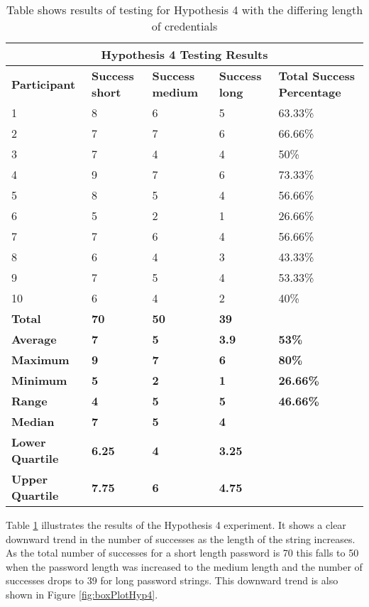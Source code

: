 \documentclass{article}
\begin{document}
{
\begin{table} [H]
\centering
\begin{tabular}{ |p{2cm}|p{2cm}|p{2cm}| p{2cm}| p{2cm}| }
\hline
\multicolumn{5}{|c|}{\textbf{Hypothesis 4 Testing Results}} \\
\hline
\textbf{Participant} & \textbf{Success short} & \textbf{Success medium} & \textbf{Success long}  & \textbf{Total Success Percentage} \\
\hline
1 & 8 & 6 & 5 & 63.33\% \\
\hline
2 & 7 & 7 & 6 & 66.66\% \\
\hline
3 & 7 & 4 & 4 & 50\% \\
\hline
4 & 9 & 7 & 6 & 73.33\%  \\
\hline
5 & 8 & 5 & 4 & 56.66\% \\
\hline
6 & 5 & 2 & 1 & 26.66\% \\
\hline
7 & 7 & 6 & 4 & 56.66\% \\
\hline
8 & 6 & 4 & 3 & 43.33\% \\
\hline
9 & 7 & 5 & 4 & 53.33\% \\
\hline
10 & 6 & 4 & 2 & 40\% \\
\hline
\textbf{Total} & \textbf{70} & \textbf{50} & \textbf{39} & \\
\hline
\textbf{Average} & \textbf{7} & \textbf{5} & \textbf{3.9} & \textbf{53\%} \\
\hline
\textbf{Maximum} & \textbf{9} & \textbf{7} & \textbf{6} & \textbf{80\%} \\
\hline
\textbf{Minimum} & \textbf{5} & \textbf{2} & \textbf{1} & \textbf{26.66\%} \\
\hline
\textbf{Range} & \textbf{4} & \textbf{5} & \textbf{5} & \textbf{46.66\%} \\
\hline
\textbf{Median} & \textbf{7} & \textbf{5} & \textbf{4} & \\
\hline
\textbf{Lower Quartile} & \textbf{6.25} & \textbf{4} & \textbf{3.25} &  \\
\hline
\textbf{Upper Quartile}& \textbf{7.75} & \textbf{6} & \textbf{4.75} &  \\
\hline
\end{tabular}
\caption{Table shows results of testing for Hypothesis 4 with the differing length of credentials}
\label{table:5}
\end{table}
}

Table \ref{table:5} illustrates the results of the Hypothesis 4 experiment. It shows a clear downward trend in the number of successes as the length of the string increases. As the total number of successes for a short length password is 70 this falls to 50 when the password length was increased to the medium length and the number of successes drops to 39 for long password strings. This downward trend is also shown in Figure \ref{fig:boxPlotHyp4}. 
\end{document}
